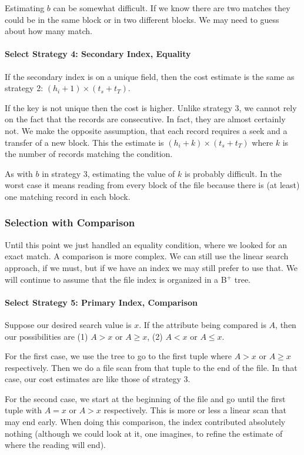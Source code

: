 Estimating $b$ can be somewhat difficult. If we know there are two matches they could be in the same block or in two different blocks. We may need to guess about how many match.

\paragraph{Select Strategy 4: Secondary Index, Equality}
If the secondary index is on a unique field, then the cost estimate is the same as strategy 2:  $(h_{i} + 1) \times (t_{s} + t_{T})$.

If the key is not unique then the cost is higher. Unlike strategy 3, we cannot rely on the fact that the records are consecutive. In fact, they are almost certainly not. We make the opposite assumption, that each record requires a seek and a transfer of a new block. This the estimate is $(h_{i} + k) \times (t_{s} + t_{T})$ where $k$ is the number of records matching the condition.

As with $b$ in strategy 3, estimating the value of $k$ is probably difficult. In the worst case it means reading from every block of the file because there is (at least) one matching record in each block.

\subsubsection*{Selection with Comparison}

Until this point we just handled an equality condition, where we looked for an exact match. A comparison is more complex. We can still use the linear search approach, if we must, but if we have an index we may still prefer to use that. We will continue to assume that the file index is organized in a B$^{+}$ tree.

\paragraph{Select Strategy 5: Primary Index, Comparison}
Suppose our desired search value is $x$. If the attribute being compared is $A$, then our possibilities are (1) $A > x$ or $A \geq x$, (2) $A < x$ or $A \leq x$.

For the first case, we use the tree to go to the first tuple where $A > x$ or $A \geq x$ respectively. Then we do a file scan from that tuple to the end of the file. In that case, our cost estimates are like those of strategy 3.

For the second case, we start at the beginning of the file and go until the first tuple with $A = x$ or $A > x$ respectively. This is more or less a linear scan that may end early. When doing this comparison, the index contributed absolutely nothing (although we could look at it, one imagines, to refine the estimate of where the reading will end).

